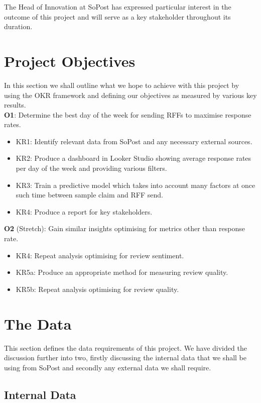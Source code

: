 \documentclass[12pt]{scrartcl}
\begin{document}
The Head of Innovation at SoPost has expressed particular interest in the outcome
of this project and will serve as a key stakeholder throughout its duration.

\section{Project Objectives}
\label{section:objectives}

In this section we shall outline what we hope to achieve with this project by using
the OKR framework and defining our objectives as measured by various key results.\\

\textbf{O1}: Determine the best day of the week for sending RFFs to maximise response rates.
\begin{itemize}
    \item KR1: Identify relevant data from SoPost and any necessary external sources.
    \item KR2: Produce a dashboard in Looker Studio showing average response rates
        per day of the week and providing various filters.
    \item KR3: Train a predictive model which takes into account many factors at once
        such time between sample claim and RFF send.
    \item KR4: Produce a report for key stakeholders.
\end{itemize}

\textbf{O2} (Stretch): Gain similar insights optimising for metrics other than response rate.
\begin{itemize}
    \item KR4: Repeat analysis optimising for review sentiment.
    \item KR5a: Produce an appropriate method for measuring review quality.
    \item KR5b: Repeat analysis optimising for review quality.
\end{itemize}

\section{The Data}

This section defines the data requirements of this project. We have divided
the discussion further into two, firstly discussing the internal data that
we shall be using from SoPost and secondly any external data we shall require.

\subsection{Internal Data}
\end{document}
